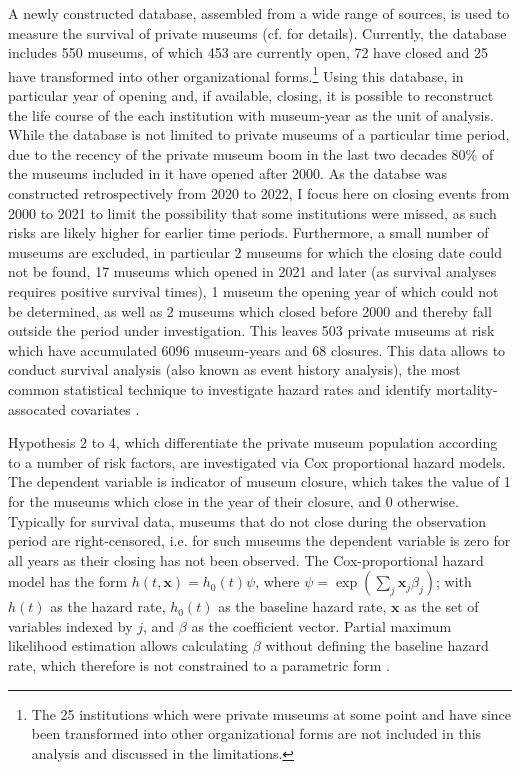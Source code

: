 \documentclass[12pt]{article}
\begin{document}
A newly constructed database, assembled from a wide range of sources, is used to measure the survival of private museums (cf. \textcite{Velthuis_etal_2023_boom} for details).
Currently, the database includes 550 museums, of which 453 are currently open, 72 have closed and 25 have transformed into other organizational forms.\footnote{The 25 institutions which were private museums at some point and have since been transformed into other organizational forms are not included in this analysis and discussed in the limitations.}
Using this database, in particular year of opening and, if available, closing, it is possible to reconstruct the life course of the each institution with museum-year as the unit of analysis.
While the database is not limited to private museums of a particular time period, due to the recency of the private museum boom in the last two decades 80\% of the museums included in it have opened after 2000.
As the databse was constructed retrospectively from 2020 to 2022, I focus here on closing events from 2000 to 2021 to limit the possibility that some institutions were missed, as such risks are likely higher for earlier time periods.
Furthermore, a small number of museums are excluded, in particular 2 museums for which the closing date could not be found, 17 museums which opened in 2021 and later (as survival analyses requires positive survival times), 1 museum the opening year of which could not be determined, as well as 2 museums which closed before 2000 and thereby fall outside the period under investigation.
This leaves 503 private museums at risk which have accumulated 6096 museum-years and 68 closures.
This data allows to conduct survival analysis (also known as event history analysis), the most common statistical technique to investigate hazard rates and identify mortality-assocated covariates \parencite{Moore_2015_survival,Allison_2014_event}.




Hypothesis 2 to 4, which differentiate the private museum population according to a number of risk factors, are investigated via Cox proportional hazard models. 
The dependent variable is indicator of museum closure, which takes the value of 1 for the museums which close in the year of their closure, and 0 otherwise.
Typically for survival data, museums that do not close during the observation period are right-censored, i.e. for such museums the dependent variable is zero for all years as their closing has not been observed.
The Cox-proportional hazard model has the form \(h(t,\mathbf{x}) = h_0(t) \psi\), where \(\psi = \exp(\sum_{j} \mathbf{x}_j \beta_j)\); with \(h(t)\) as the hazard rate, \(h_0(t)\) as the baseline hazard rate, \(\mathbf{x}\) as the set of variables indexed by \(j\), and \(\beta\) as the coefficient vector.
Partial maximum likelihood estimation allows calculating \(\beta\) without defining the baseline hazard rate, which therefore is not constrained to a parametric form \parencite{Moore_2015_survival}.
\end{document}
